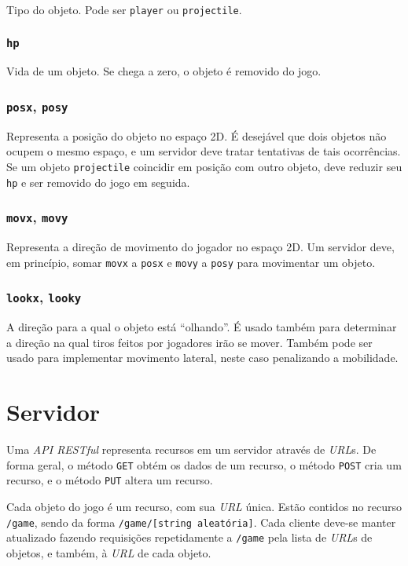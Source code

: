 \documentclass[12pt,a4paper]{article}
\begin{document}
Tipo do objeto. Pode ser \texttt{player} ou \texttt{projectile}.

\subsubsection{\texttt{hp}}

Vida de um objeto. Se chega a zero, o objeto é removido do jogo.

\subsubsection{\texttt{posx}, \texttt{posy}}

Representa a posição do objeto no espaço 2D. É desejável que dois objetos não
ocupem o mesmo espaço, e um servidor deve tratar tentativas de tais
ocorrências. Se um objeto \texttt{projectile} coincidir em posição com outro
objeto, deve reduzir seu \texttt{hp} e ser removido do jogo em seguida.

\subsubsection{\texttt{movx}, \texttt{movy}}

Representa a direção de movimento do jogador no espaço 2D. Um servidor deve, em
princípio, somar \texttt{movx} a \texttt{posx} e \texttt{movy} a \texttt{posy}
para movimentar um objeto.

\subsubsection{\texttt{lookx}, \texttt{looky}}

A direção para a qual o objeto está ``olhando''. É usado também para determinar
a direção na qual tiros feitos por jogadores irão se mover. Também pode ser
usado para implementar movimento lateral, neste caso penalizando a mobilidade.

\pagebreak \section{Servidor}

Uma \textit{API RESTful} representa recursos em um servidor através de
\textit{URL}s. De forma geral, o método \texttt{GET} obtém os dados de um
recurso, o método \texttt{POST} cria um recurso, e o método \texttt{PUT} altera
um recurso.

Cada objeto do jogo é um recurso, com sua \textit{URL} única. Estão contidos no
recurso \texttt{/game}, sendo da forma \texttt{/game/[string aleatória]}. Cada
cliente deve-se manter atualizado fazendo requisições repetidamente a
\texttt{/game} pela lista de \textit{URL}s de objetos, e também, à \textit{URL}
de cada objeto.
\end{document}
